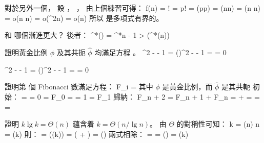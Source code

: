 對於另外一個，
設 ， ，
由上個練習可得：
\startformula\startalign
 \NC \lg f(n) \NC = \lg \lceil{}\rceil ! \NR
 \NC          \NC = \lg p! \NR
 \NC          \NC = \Theta(p\lg p) \NR
 \NC          \NC = \Theta(\lceil\lg\lg n\rceil \lg \lceil \lg\lg n\rceil) \NR
 \NC          \NC = \Theta(\lg\lg n \cdot \lg\lg\lg n) \NR
 \NC          \NC = o(\lg\lg n \cdot \lg\lg n) \NR
 \NC          \NC = o(\lg^2\lg n) \NR
 \NC          \NC = o(\lg n) \NR
\stopalign\stopformula
所以  {\EMP 是}多項式有界的。
\stopANSWER

\startEXERCISE\DIFFICULT
{} 和  哪個漸進更大？
\stopEXERCISE
\startANSWER
後者：
\startformula
\lg^*() = \lg^*n - 1 > \lg(\lg^*(n))
\stopformula
\stopANSWER

\startEXERCISE
證明黃金比例 $\phi$ 及其共扼 $\hat \phi$ 均滿足方程 。
\stopEXERCISE
\startANSWER
\startformula\startalign
 \NC \phi^2 - \phi - 1
     \NC = ()^2 -  - 1 \NR
 \NC \NC =  \NR
 \NC \NC = 0 \NR
\stopalign\stopformula

\startformula\startalign
 \NC \hat\phi^2 - \hat\phi - 1
     \NC = ()^2 -  - 1 \NR
 \NC \NC =  \NR
 \NC \NC = 0 \NR
\stopalign\stopformula
\stopANSWER

\startEXERCISE
證明第  個 Fibonacci 數滿足方程：
\startformula
F_i = 
\stopformula
其中 $\phi$ 是黃金比例，而 $\hat \phi$ 是其共軛
\stopEXERCISE
\startANSWER
初始：
\startformula\startalign
\NC {}
    \NC =  = 0 = F_0 \NR
\NC {}
    \NC =  = 1 = F_1 \NR
\stopalign\stopformula
歸納：
\startformula\startalign
 \NC F_{n + 2} \NC = F_{n + 1} + F_n \NR
 \NC \NC =  +  \NR
 \NC \NC =  \NR
 \NC \NC =  \NR
 \NC \NC =  \NR
\stopalign\stopformula
\stopANSWER

\startEXERCISE
證明 $k\lg k = \Theta(n)$ 蘊含着 $k = \Theta(n/\lg n)$。
\stopEXERCISE
\startANSWER
由 $\Theta$ 的對稱性可知：
\startformula
k = \Theta(n) \Rightarrow n = \Theta(k)
\stopformula
則：
\startformula\startmathalignment
\NC {}
    \NC = \Theta(\lg(k)) \NR
\NC \NC = \Theta( + \lg{}) \NR
\NC \NC = \Theta() \NR
\stopmathalignment\stopformula
兩式相除：
\startformula
{}
  = 
  = \Theta()
  = \Theta(k)
\stopformula
\stopANSWER

\stopsection

